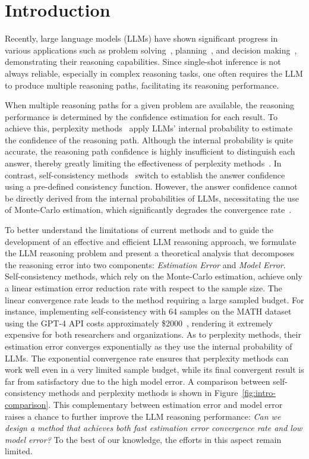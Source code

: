 \section{Introduction}

Recently, large language models (LLMs) have shown significant progress in various applications such as problem solving~\citep{LewkowyczADDMRS22, li24coc}, planning~\citep{ValmeekamMSK23plan, deng24plan}, and decision making~\citep{Ouyang023decision, SblendorioDCGPC24decision}, demonstrating their reasoning capabilities. 
Since single-shot inference is not always reliable, especially in complex reasoning tasks, one often requires the LLM to produce multiple reasoning paths, facilitating its reasoning performance.

When multiple reasoning paths for a given problem are available, the reasoning performance is determined by the confidence estimation for each result.
To achieve this, perplexity methods~\citep{chen1998evaluation, murugadoss2025evaluating} apply LLMs' internal probability to estimate the confidence of the reasoning path. 
Although the internal probability is quite accurate, the reasoning path confidence is highly insufficient to distinguish each answer, thereby greatly limiting the effectiveness of perplexity methods~\citep{chen24steering}.
In contrast,
self-consistency methods~\citep{wang2022self, chen2023universal} switch to establish the answer confidence using a pre-defined consistency function. 
However, the answer confidence cannot be directly derived from the internal probabilities of LLMs, necessitating the use of Monte-Carlo estimation, which significantly degrades the convergence rate~\citep{amad23adaptive, wang24dynamic, wang24make}.

To better understand the limitations of current methods and to guide the development of an effective and efficient LLM reasoning approach, we formulate the LLM reasoning problem and present a theoretical analysis that decomposes the reasoning error into two components: \emph{Estimation Error} and \emph{Model Error}. 
Self-consistency methods, which rely on the Monte-Carlo estimation, achieve only a linear estimation error reduction rate with respect to the sample size.
The linear convergence rate leads to the method requiring a large sampled budget.
For instance, implementing self-consistency with 64 samples on the MATH dataset using the GPT-4 API costs approximately \$2000~\citep{li24escape}, rendering it extremely expensive for both researchers and organizations.
As to perplexity methods, their estimation error converges exponentially as they use the internal probability of LLMs.
The exponential convergence rate ensures that perplexity methods can work well even in a very limited sample budget, while its final convergent result is far from satisfactory due to the high model error.
A comparison between self-consistency methods and perplexity methods is shown in Figure~\ref{fig:intro-comparison}.
This complementary between estimation error and model error raises a chance to further improve the LLM reasoning performance:
\emph{Can we design a method that achieves both fast estimation error convergence rate and low model error?}
To the best of our knowledge, the efforts in this aspect remain limited.

